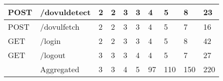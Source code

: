 \begin{table*}[]
\begin{tabular}{|p{}|p{}|p{}|p{}|p{}|p{}|p{}|p{}|p{}|p{}|}
POST                                  & /dovuldetect                       & 2                                          & 2                                          & 3                                          & 3                                          & 4                                          & 5                                          & 8                                          & 23                                          \\ \hline
POST                                  & /dovulfetch                        & 2                                          & 2                                          & 3                                          & 3                                          & 4                                          & 5                                          & 7                                          & 16                                          \\ \hline
GET                                   & /login                             & 2                                          & 2                                          & 3                                          & 3                                          & 4                                          & 5                                          & 8                                          & 42                                          \\ \hline
GET                                   & /logout                            & 3                                          & 3                                          & 3                                          & 4                                          & 4                                          & 5                                          & 7                                          & 27                                          \\ \hline
                                      & Aggregated                         & 3                                          & 3                                          & 4                                          & 5                                          & 97                                         & 110                                        & 150                                        & 220                                         \\ \hline
\end{tabular}
  \end{table*}